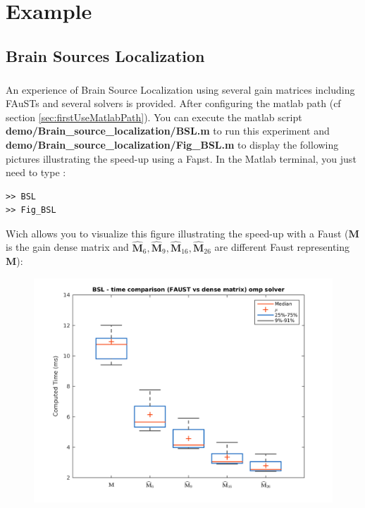 \chapter{Example}\label{sec:example}

\section{Brain Sources Localization}\label{sec:BSL_example}
%



\paragraph{} An experience of Brain Source Localization using several gain matrices including FAuSTs and several solvers is provided. After configuring the matlab path (cf section \ref{sec:firstUseMatlabPath}). You can execute the matlab script \textbf{demo/Brain\_source\_localization/BSL.m} to run this experiment and \textbf{demo/Brain\_source\_localization/Fig\_BSL.m} to display the following pictures illustrating the speed-up using a Faµst.
In the Matlab terminal, you just need to type :
\begin{lstlisting}
>> BSL
>> Fig_BSL
\end{lstlisting}

Wich allows you to visualize this figure illustrating the speed-up with a Faust ($\mathbf{M}$ is the gain dense matrix and $\widehat{\mathbf{M}}_{6},\widehat{\mathbf{M}}_{9},\widehat{\mathbf{M}}_{16},\widehat{\mathbf{M}}_{26}$ are different Faust representing  $\mathbf{M}$):

\begin{figure}[!htbp]
\label{fig:BSL}
\includegraphics[scale=0.7]{images/BSL.png}
\end{figure}
